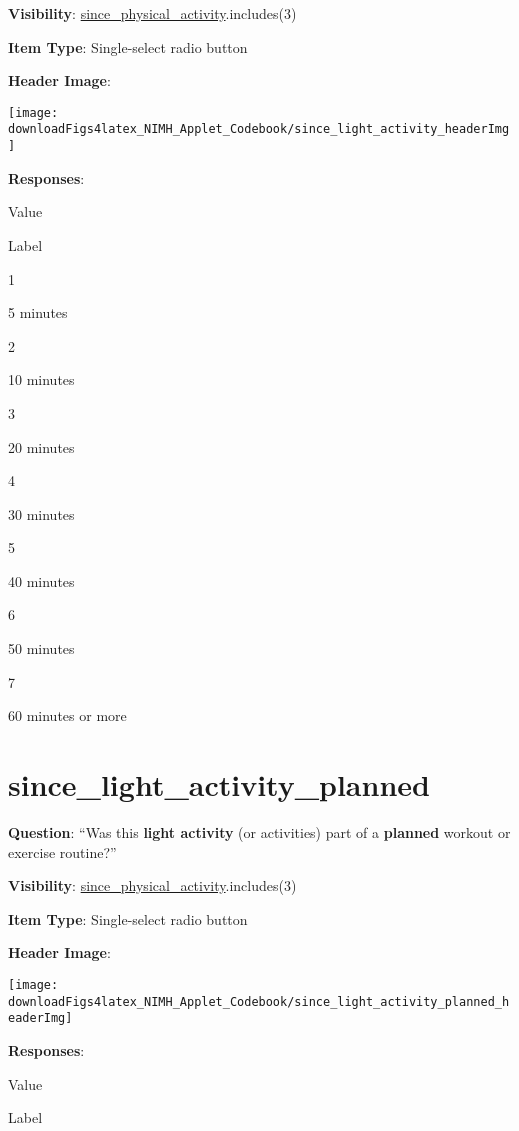 \documentclass[]{book}
\begin{document}
\textbf{Visibility}: \protect\hyperlink{since_physical_activity}{since\_physical\_activity}.includes(3)

\textbf{Item Type}: Single-select radio button

\textbf{Header Image}:

\begin{flushleft}\texttt{[image: downloadFigs4latex\_NIMH\_Applet\_Codebook/since\_light\_activity\_headerImg]} \end{flushleft}

\textbf{Responses}:

Value

Label

1

5 minutes

2

10 minutes

3

20 minutes

4

30 minutes

5

40 minutes

6

50 minutes

7

60 minutes or more

\hypertarget{since_light_activity_planned}{%
\section{since\_light\_activity\_planned}\label{since_light_activity_planned}}

\textbf{Question}: ``Was this \textbf{light activity} (or activities) part of a \textbf{planned} workout or exercise routine?''

\textbf{Visibility}: \protect\hyperlink{since_physical_activity}{since\_physical\_activity}.includes(3)

\textbf{Item Type}: Single-select radio button

\textbf{Header Image}:

\begin{flushleft}\texttt{[image: downloadFigs4latex\_NIMH\_Applet\_Codebook/since\_light\_activity\_planned\_headerImg]} \end{flushleft}

\textbf{Responses}:

Value

Label
\end{document}
